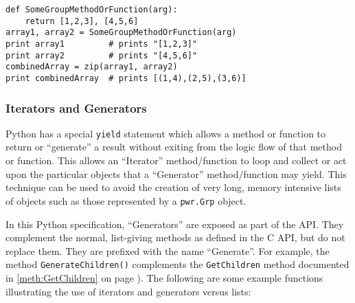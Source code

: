 \begin{center}\begin{minipage}{.95\linewidth}\begin{lstlisting}
def SomeGroupMethodOrFunction(arg):
    return [1,2,3], [4,5,6]
array1, array2 = SomeGroupMethodOrFunction(arg)
print array1         # prints "[1,2,3]"
print array2         # prints "[4,5,6]"
combinedArray = zip(array1, array2)
print combinedArray  # prints [(1,4),(2,5),(3,6)]
\end{lstlisting}\end{minipage}\end{center}

\subsubsection{Iterators and Generators}\label{sec:PythonIteratorsGenerators}

Python has a special \texttt{yield} statement which allows a method or function to
return or ``generate'' a result without exiting from the logic flow of that
method or function. This allows an ``Iterator'' method/function to loop and
collect or act upon the particular objects that a ``Generator'' method/function
may yield. This technique can be used to avoid the creation of very long,
memory intensive lists of objects such as those represented by a
\texttt{pwr.Grp} object.

In this Python specification, ``Generators'' are exposed as part of the API.
They complement the normal, list-giving methods as defined in the C API, but do
not replace them. They are prefixed with the name ``Generate''. For example,
the method \texttt{GenerateChildren()} complements the \texttt{GetChildren}
method documented in \ref{meth:GetChildren} on page
\pageref{meth:GetChildren}). The following are some example functions
illustrating the use of iterators and generators versus lists:

